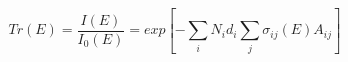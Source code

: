\documentclass{article}
\begin{document}
$$Tr\left( E \right) =\frac { I\left( E \right)  }{ { I }_{ 0 }\left( E \right)  } =exp\left[ -\sum_{ i }^{  } { { N }_{ i }{ d }_{ i } } \sum_{ j }^{  } { { \sigma  }_{ ij }\left( E \right) { A }_{ ij } }  \right]$$
\end{document}
